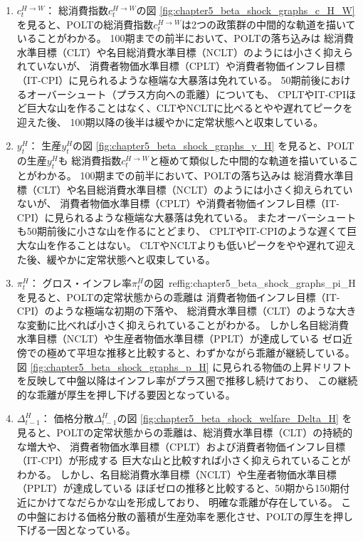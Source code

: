 \begin{enumerate}
    \item
    \label{itm:chapter5_beta_shock_policies_polt_c_H_W}
        \(c_t^{H\to W}\)：
        総消費指数\(c_t^{H\to W}\)の図
        \ref{fig:chapter5_beta_shock_graphs_c_H_W}
        を見ると、POLTの総消費指数\(c_t^{H\to W}\)は2つの政策群の中間的な軌道を描いていることがわかる。
        100期までの前半において、POLTの落ち込みは
        総消費水準目標（CLT）や名目総消費水準目標（NCLT）のようには小さく抑えられていないが、
        消費者物価水準目標（CPLT）や消費者物価インフレ目標（IT-CPI）に見られるような極端な大暴落は免れている。
        50期前後におけるオーバーシュート（プラス方向への乖離）についても、
        CPLTやIT-CPIほど巨大な山を作ることはなく、CLTやNCLTに比べるとやや遅れてピークを迎えた後、
        100期以降の後半は緩やかに定常状態へと収束している。
    \item
    \label{itm:chapter5_beta_shock_policies_polt_y_H}
        \(y_t^H\)：
        生産\(y_t^H\)の図
        \ref{fig:chapter5_beta_shock_graphs_y_H}
        を見ると、POLTの生産\(y_t^H\)も
        総消費指数\(c_t^{H\to W}\)と極めて類似した中間的な軌道を描いていることがわかる。
        100期までの前半において、POLTの落ち込みは
        総消費水準目標（CLT）や名目総消費水準目標（NCLT）のようには小さく抑えられていないが、
        消費者物価水準目標（CPLT）や消費者物価インフレ目標（IT-CPI）に見られるような極端な大暴落は免れている。
        またオーバーシュートも50期前後に小さな山を作るにとどまり、
        CPLTやIT-CPIのような遅くて巨大な山を作ることはない。
        CLTやNCLTよりも低いピークをやや遅れて迎えた後、緩やかに定常状態へと収束している。
    \item
    \label{itm:chapter5_beta_shock_policies_polt_pi_H}
        \(\pi_t^H\)：
        グロス・インフレ率\(\pi_t^H\)の図\
        ref{fig:chapter5_beta_shock_graphs_pi_H}
        を見ると、POLTの定常状態からの乖離は
        消費者物価インフレ目標（IT-CPI）のような極端な初期の下落や、
        総消費水準目標（CLT）のような大きな変動に比べれば小さく抑えられていることがわかる。
        しかし名目総消費水準目標（NCLT）や生産者物価水準目標（PPLT）が達成している
        ゼロ近傍での極めて平坦な推移と比較すると、わずかながら乖離が継続している。
        図
        \ref{fig:chapter5_beta_shock_graphs_p_H}
        に見られる物価の上昇ドリフトを反映して中盤以降はインフレ率がプラス圏で推移し続けており、
        この継続的な乖離が厚生を押し下げる要因となっている。
    \item
    \label{itm:chapter5_beta_shock_policies_polt_Delta_t_minus_1_H}
        \(\Delta_{t-1}^H\)：
        価格分散\(\Delta_{t-1}^H\)の図
        \ref{fig:chapter5_beta_shock_welfare_Delta_H}
        を見ると、POLTの定常状態からの乖離は、総消費水準目標（CLT）の持続的な増大や、
        消費者物価水準目標（CPLT）および消費者物価インフレ目標（IT-CPI）が形成する
        巨大な山と比較すれば小さく抑えられていることがわかる。
        しかし、名目総消費水準目標（NCLT）や生産者物価水準目標（PPLT）が達成している
        ほぼゼロの推移と比較すると、50期から150期付近にかけてなだらかな山を形成しており、
        明確な乖離が存在している。
        この中盤における価格分散の蓄積が生産効率を悪化させ、POLTの厚生を押し下げる一因となっている。
\end{enumerate}